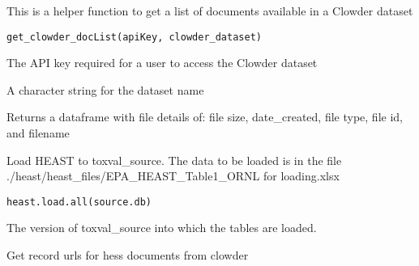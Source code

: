 \documentclass[letterpaper]{book}
\begin{document}
%
\begin{Description}\relax
This is a helper function to get a list of documents available in a Clowder dataset
\end{Description}
%
\begin{Usage}
\begin{verbatim}
get_clowder_docList(apiKey, clowder_dataset)
\end{verbatim}
\end{Usage}
%
\begin{Arguments}
\begin{ldescription}
\item[\code{apiKey}] The API key required for a user to access the Clowder dataset

\item[\code{clowder\_dataset}] A character string for the dataset name
\end{ldescription}
\end{Arguments}
%
\begin{Value}
Returns a dataframe with file details of: file size, date\_created, file type, file id, and filename
\end{Value}
%
\begin{Description}\relax
Load HEAST to toxval\_source. The data to be loaded is in the file
./heast/heast\_files/EPA\_HEAST\_Table1\_ORNL for loading.xlsx
\end{Description}
%
\begin{Usage}
\begin{verbatim}
heast.load.all(source.db)
\end{verbatim}
\end{Usage}
%
\begin{Arguments}
\begin{ldescription}
\item[\code{source.db}] The version of toxval\_source into which the tables are loaded.
\end{ldescription}
\end{Arguments}
%
\begin{Description}\relax
Get record urls for hess documents from clowder
\end{Description}
\end{document}
